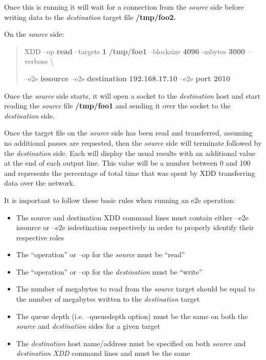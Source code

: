 Once this is running it will wait for a connection from the \emph{source} side before writing data to the \emph{destination} target file \textbf{/tmp/foo2.}

On the \emph{source} side:

\begin{quote}
XDD --op \textbf{read} --targets \textbf{1} \textbf{/tmp/foo1} --blocksize \textbf{4096} -mbytes \textbf{3000} --verbose \textbackslash{}

--e2e \textbf{issource} --e2e \textbf{destination} \textbf{192.168.17.10} --e2e \textbf{port 2010}
\end{quote}

Once the \emph{source} side starts, it will open a socket to the \emph{destination} host and start reading the \emph{source} file \textbf{/tmp/foo1} and sending it over the socket to the \emph{destination} side.

Once the target file on the \emph{source} side has been read and transferred, assuming no additional passes are requested, then the \emph{source} side will terminate followed by the \emph{destination} side. Each will display the usual results with an additional value at the end of each output line. This value will be a number between 0 and 100 and represents the percentage of total time that was spent by XDD transferring data over the network.

It is important to follow these basic rules when running an e2e operation:

\begin{itemize}
\item
  The source and destination XDD command lines must contain either --e2e issource or --e2e isdestination respectively in order to properly identify their respective roles
\item
  The ``operation'' or --op for the \emph{source} must be ``read''
\item
  The ``operation'' or --op for the \emph{destination} must be ``write''
\item
  The number of megabytes to read from the \emph{source} target should be equal to the number of megabytes written to the \emph{destination} target
\item
  The queue depth (i.e. --queuedepth option) must be the same on both the \emph{source} and \emph{destination} sides for a given target
\item
  The \emph{destination} host name/address must be specified on both \emph{source} and \emph{destination} \emph{XDD} command lines and must be the same
\end{itemize}

